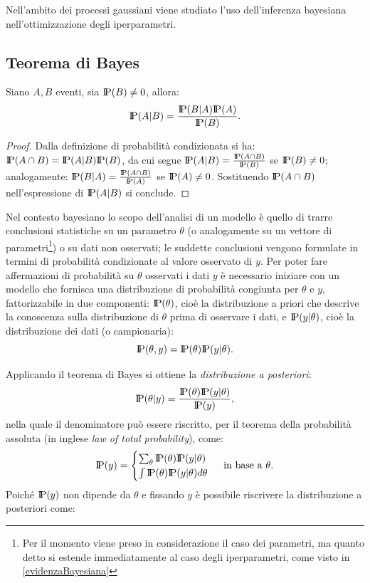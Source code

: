 Nell'ambito dei processi gaussiani viene studiato l'uso dell'inferenza bayesiana nell'ottimizzazione degli iperparametri.

\newpage

\subsection{Teorema di Bayes}
\begin{teo}
Siano $A, B$ eventi, sia $\text{I\kern-0.18em P}(B)\neq 0$, allora:
\[
\text{I\kern-0.18em P}(A|B) = \frac{\text{I\kern-0.18em P}(B|A)\text{I\kern-0.18em P}(A)}{\text{I\kern-0.18em P}(B)}.
\]
\end{teo}
\begin{proof}
Dalla definizione di probabilità condizionata si ha: $\text{I\kern-0.18em P}(A\cap B) = \text{I\kern-0.18em P}(A|B)\text{I\kern-0.18em P}(B)$, da cui segue $\text{I\kern-0.18em P}(A|B)=\frac{\text{I\kern-0.18em P}(A\cap B)}{\text{I\kern-0.18em P}(B)}$ se $\text{I\kern-0.18em P}(B)\neq 0$; analogamente: $\text{I\kern-0.18em P}(B|A)=\frac{\text{I\kern-0.18em P}(A\cap B)}{\text{I\kern-0.18em P}(A)}$ se $\text{I\kern-0.18em P}(A)\neq 0$. Sostituendo $\text{I\kern-0.18em P}(A\cap B)$ nell'espressione di $\text{I\kern-0.18em P}(A|B)$ si conclude.
\end{proof}

\vspace{0.5cm}

Nel contesto bayesiano lo scopo dell'analisi di un modello è quello di trarre conclusioni statistiche su un parametro $\theta$ (o analogamente su un vettore di parametri\footnote{Per il momento viene preso in considerazione il caso dei parametri, ma quanto detto si estende immediatamente al caso degli iperparametri, come visto in \ref{evidenzaBayesiana}}) o su dati non osservati; le suddette conclusioni vengono formulate in termini di probabilità condizionate al valore osservato di $y$. 
Per poter fare affermazioni di probabilità su $\theta$ osservati i dati $y$ è necessario iniziare con un modello che fornisca una distribuzione di probabilità congiunta per $\theta$ e $y$, fattorizzabile in due componenti: $\text{I\kern-0.18em P}(\theta)$, cioè la distribuzione a priori che descrive la conoscenza sulla distribuzione di $\theta$ prima di osservare i dati, e $\text{I\kern-0.18em P}(y|\theta)$, cioè la distribuzione dei dati (o campionaria):
\[
\text{I\kern-0.18em P}(\theta, y)=\text{I\kern-0.18em P}(\theta)\text{I\kern-0.18em P}(y|\theta).
\]

Applicando il teorema di Bayes si ottiene la \textit{distribuzione a posteriori}:
\[
\text{I\kern-0.18em P}(\theta | y)=\frac{\text{I\kern-0.18em P}(\theta)\text{I\kern-0.18em P}(y|\theta)}{\text{I\kern-0.18em P}(y)},
\]
nella quale il denominatore può essere riscritto, per il teorema della probabilità assoluta (in inglese \textit{law of total probability}), come:
\[
\text{I\kern-0.18em P}(y)=\begin{cases}\sum_\theta \text{I\kern-0.18em P}(\theta)\text{I\kern-0.18em P}(y| \theta)\\\int\text{I\kern-0.18em P}(\theta)\text{I\kern-0.18em P}(y| \theta)d\theta \end{cases} \text{ in base a }\theta.
\]
Poiché $\text{I\kern-0.18em P}(y)$ non dipende da $\theta$ e fissando $y$ è possibile riscrivere la distribuzione a posteriori come:

